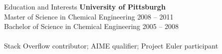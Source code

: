 \documentclass{resume}
\begin{document}

\begin{rSection}{Education and Interests}
{\bf University of Pittsburgh} \\ 
Master of Science in Chemical Engineering
\hfill {2008 -- 2011} \\
Bachelor of Science in Chemical Engineering
\hfill {2005 -- 2008} \\ \\
Stack Overflow contributor;
AIME qualifier; Project Euler participant
\end{rSection}
\end{document}
